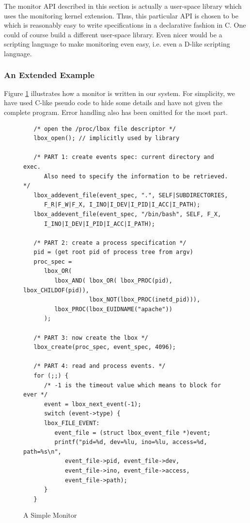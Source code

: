 The monitor API described in this section is actually a user-space library
which uses the monitoring kernel extension. Thus, this particular
API is chosen to be which is reasonably easy to write specifications
in a declarative fashion in C.
One could of course build a different user-space library.
Even nicer would be a scripting language to make monitoring even easy,
i.e. even a D-like scripting language.

\subsubsection{An Extended Example}
\label{sec:lbox-eg}

Figure \ref{fig:lbox-eg-prog} illustrates how a monitor is written in our system.
For simplicity, we have used C-like pseudo code to
hide some details and have not given the complete program.
Error handling also has been omitted for the most part.

\begin{figure}[htbp]
\small
\begin{center}
\begin{verbatim}
   /* open the /proc/lbox file descriptor */
   lbox_open(); // implicitly used by library

   /* PART 1: create events spec: current directory and exec.
      Also need to specify the information to be retrieved. */
   lbox_addevent_file(event_spec, ".", SELF|SUBDIRECTORIES,
      F_R|F_W|F_X, I_INO|I_DEV|I_PID|I_ACC|I_PATH);
   lbox_addevent_file(event_spec, "/bin/bash", SELF, F_X,
      I_INO|I_DEV|I_PID|I_ACC|I_PATH);

   /* PART 2: create a process specification */
   pid = (get root pid of process tree from argv)
   proc_spec = 
      lbox_OR(
         lbox_AND( lbox_OR( lbox_PROC(pid), lbox_CHILDOF(pid)), 
                   lbox_NOT(lbox_PROC(inetd_pid))),
         lbox_PROC(lbox_EUIDNAME("apache"))
      );

   /* PART 3: now create the lbox */
   lbox_create(proc_spec, event_spec, 4096);
 
   /* PART 4: read and process events. */
   for (;;) {
      /* -1 is the timeout value which means to block for ever */
      event = lbox_next_event(-1);
      switch (event->type) {
      lbox_FILE_EVENT:
         event_file = (struct lbox_event_file *)event;
         printf("pid=%d, dev=%lu, ino=%lu, access=%d, path=%s\n",
            event_file->pid, event_file->dev,
            event_file->ino, event_file->access,
            event_file->path);
      }
   }
\end{verbatim}
\end{center}
\caption{A Simple Monitor}
\label{fig:lbox-eg-prog}
\end{figure}

